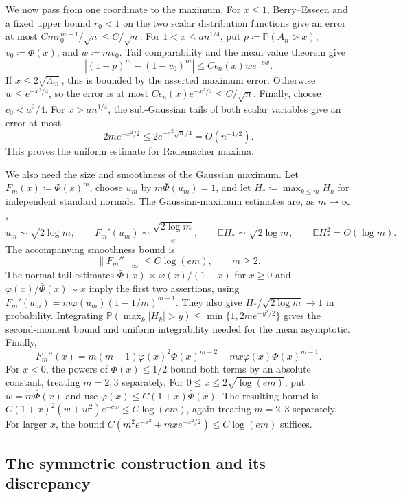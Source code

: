\documentclass[11pt,letterpaper]{article}
\theoremstyle{remark}
\newcommand{\E}{\mathbb E}
\newcommand{\Pp}{\mathbb P}
\begin{document}
We now pass from one coordinate to the maximum. For \(x\le1\),
Berry--Esseen and a fixed upper bound \(r_0<1\) on the two scalar
distribution functions give an error at most
\(Cm r_0^{m-1}/\sqrt n\le C/\sqrt n\). For
\(1<x\le an^{1/4}\), put \(p\coloneqq\Pp(A_n>x)\),
\(v_0\coloneqq\bar\Phi(x)\), and \(w\coloneqq mv_0\).
Tail comparability and the mean value theorem give
\[
 |(1-p)^m-(1-v_0)^m|\le C\epsilon_n(x)w e^{-cw}.
\]
If \(x\le2\sqrt{\Lambda_m}\), this is bounded by the asserted
maximum error. Otherwise \(w\le e^{-x^2/4}\), so the error is
at most \(C\epsilon_n(x)e^{-x^2/4}\le C/\sqrt n\).
Finally, choose \(c_0<a^2/4\). For \(x>an^{1/4}\), the
sub-Gaussian tails of both scalar variables give an error at most
\[
 2m e^{-x^2/2}\le2e^{-a^2\sqrt n/4}=O(n^{-1/2}).
\]
This proves the uniform estimate for Rademacher maxima.

We also need the size and smoothness of the Gaussian maximum.
Let \(F_m(x)\coloneqq\Phi(x)^m\), choose \(u_m\) by
\(m\bar\Phi(u_m)=1\), and let \(H_*\coloneqq\max_{k\le m}H_k\)
for independent standard normals. The Gaussian-maximum estimates are,
as \(m\to\infty\),
\begin{equation}
 u_m\sim\sqrt{2\log m},\qquad
 F_m'(u_m)\sim\frac{\sqrt{2\log m}}e,\qquad
 \E H_*\sim\sqrt{2\log m},\qquad \E H_*^2=O(\log m).
 \label{sym:eq:gaussian-max}
\end{equation}
The accompanying smoothness bound is
\begin{equation}
 \|F_m''\|_\infty\le C\log(em),\qquad m\ge2.
 \label{sym:eq:gaussian-smoothness}
\end{equation}
The normal tail estimates
\(\bar\Phi(x)\asymp\varphi(x)/(1+x)\) for \(x\ge0\) and
\(\varphi(x)/\bar\Phi(x)\sim x\) imply the first two assertions,
using \(F_m'(u_m)=m\varphi(u_m)(1-1/m)^{m-1}\).
They also give \(H_*/\sqrt{2\log m}\to1\) in probability.
Integrating \(\Pp(\max_k|H_k|>y)\le\min\{1,2me^{-y^2/2}\}\)
gives the second-moment bound and uniform integrability needed for
the mean asymptotic. Finally,
\[
 F_m''(x)=m(m-1)\varphi(x)^2\Phi(x)^{m-2}
             -mx\varphi(x)\Phi(x)^{m-1}.
\]
For \(x<0\), the powers of \(\Phi(x)\le1/2\) bound both terms
by an absolute constant, treating \(m=2,3\) separately. For
\(0\le x\le2\sqrt{\log(em)}\), put \(w=m\bar\Phi(x)\) and use
\(\varphi(x)\le C(1+x)\bar\Phi(x)\). The resulting bound is
\(C(1+x)^2(w+w^2)e^{-cw}\le C\log(em)\), again treating
\(m=2,3\) separately. For larger \(x\), the bound
\(C(m^2e^{-x^2}+mx e^{-x^2/2})\le C\log(em)\) suffices.

\subsection{The symmetric construction and its discrepancy}
\end{document}
